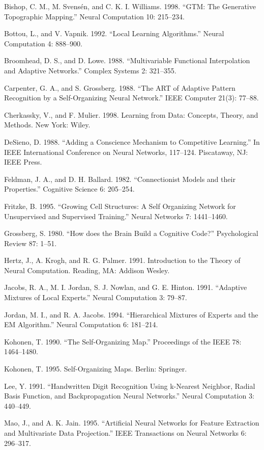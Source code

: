 Bishop, C. M., M. Svensén, and C. K. I. Williams. 1998. “GTM: The Generative Topographic Mapping.” Neural Computation 10: 215--234.

Bottou, L., and V. Vapnik. 1992. “Local Learning Algorithms.” Neural Computation 4: 888--900.

Broomhead, D. S., and D. Lowe. 1988. “Multivariable Functional Interpolation and Adaptive Networks.” Complex Systems 2: 321--355.

Carpenter, G. A., and S. Grossberg. 1988. “The ART of Adaptive Pattern Recognition by a Self-Organizing Neural Network.” IEEE Computer 21(3): 77--88.

Cherkassky, V., and F. Mulier. 1998. Learning from Data: Concepts, Theory, and Methods. New York: Wiley.

DeSieno, D. 1988. “Adding a Conscience Mechanism to Competitive Learning.” In IEEE International Conference on Neural Networks, 117--124. Piscataway, NJ: IEEE Press.

Feldman, J. A., and D. H. Ballard. 1982. “Connectionist Models and their Properties.” Cognitive Science 6: 205--254.

Fritzke, B. 1995. “Growing Cell Structures: A Self Organizing Network for Unsupervised and Supervised Training.” Neural Networks 7: 1441--1460.

Grossberg, S. 1980. “How does the Brain Build a Cognitive Code?” Psychological Review 87: 1--51.

Hertz, J., A. Krogh, and R. G. Palmer. 1991. Introduction to the Theory of Neural Computation. Reading, MA: Addison Wesley.

Jacobs, R. A., M. I. Jordan, S. J. Nowlan, and G. E. Hinton. 1991. “Adaptive Mixtures of Local Experts.” Neural Computation 3: 79--87.

Jordan, M. I., and R. A. Jacobs. 1994. “Hierarchical Mixtures of Experts and the EM Algorithm.” Neural Computation 6: 181--214.

Kohonen, T. 1990. “The Self-Organizing Map.” Proceedings of the IEEE 78: 1464--1480.

Kohonen, T. 1995. Self-Organizing Maps. Berlin: Springer.

Lee, Y. 1991. “Handwritten Digit Recognition Using k-Nearest Neighbor, Radial Basis Function, and Backpropagation Neural Networks.” Neural Computation 3: 440--449.

Mao, J., and A. K. Jain. 1995. “Artificial Neural Networks for Feature Extraction and Multivariate Data Projection.” IEEE Transactions on Neural Networks 6: 296--317.

